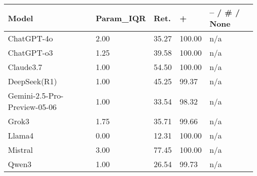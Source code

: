 \begin{tabular}{lllll}
\toprule
Model & Param_IQR & Ret. & + & -- / # / None \\
\midrule
ChatGPT-4o & 2.00 & 35.27 & 100.00 & n/a \\
ChatGPT-o3 & 1.25 & 39.58 & 100.00 & n/a \\
Claude3.7 & 1.00 & 54.50 & 100.00 & n/a \\
DeepSeek(R1) & 1.00 & 45.25 & 99.37 & n/a \\
Gemini-2.5-Pro-Preview-05-06 & 1.00 & 33.54 & 98.32 & n/a \\
Grok3 & 1.75 & 35.71 & 99.66 & n/a \\
Llama4 & 0.00 & 12.31 & 100.00 & n/a \\
Mistral & 3.00 & 77.45 & 100.00 & n/a \\
Qwen3 & 1.00 & 26.54 & 99.73 & n/a \\
\bottomrule
\end{tabular}
